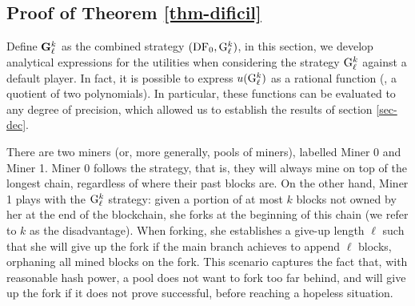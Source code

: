 \subsection{Proof of Theorem \ref{thm-dificil}}
\label{sec-evaluation-G}
Define ${\rm {\bf G}}_\ell^k$ as the combined strategy $(\text{\rm DF}_0, {\rm {G}}_\ell^k)$, in this section, we develop analytical expressions for the utilities when
considering the strategy ${\rm {G}}^k_\ell$ against a default player. In fact, it is
possible to express $u({\rm {G}}^k_\ell)$ as a rational function (\ie, a quotient of
two polynomials). In particular, these functions can be evaluated to any degree
of precision, which allowed us to establish the results of section
\ref{sec-dec}.


There are two miners (or, more generally, pools of miners), labelled Miner 0
and Miner 1. Miner 0 follows the \cdf{} strategy, that is, they will always
mine on top of the longest chain, regardless of where their past blocks are. On
the other hand, Miner 1 plays with the ${\rm {G}}^k_\ell$ strategy: given a portion
of at most $k$ blocks not owned by her at the end of the blockchain, she forks
at the beginning of this chain (we refer to $k$ as the disadvantage). When
forking, she establishes a give-up length $\ell$ such that she will give up the
fork if the main branch achieves to append $\ell$ blocks, orphaning all mined
blocks on the fork. This scenario captures the fact that, with reasonable hash
power, a pool does not want to fork too far behind, and will give up the fork
if it does not prove successful, before reaching a hopeless situation.




